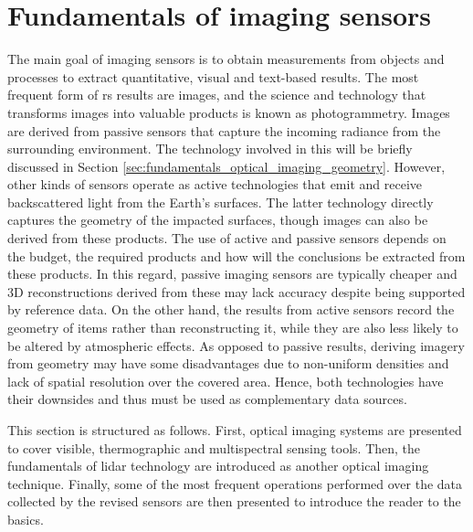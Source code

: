 \setchapterpreamble[u]{\margintoc}
\chapter{Fundamentals of imaging sensors}
\label{sec:fundamentals_rs}


The main goal of imaging sensors is to obtain measurements from objects and processes to extract quantitative, visual and text-based results. The most frequent form of \acrshort{rs} results are images, and the science and technology that transforms images into valuable products is known as photogrammetry. Images are derived from passive sensors that capture the incoming radiance from the surrounding environment. The technology involved in this will be briefly discussed in Section \ref{sec:fundamentals_optical_imaging_geometry}. However, other kinds of sensors operate as active technologies that emit and receive backscattered light from the Earth's surfaces. The latter technology directly captures the geometry of the impacted surfaces, though images can also be derived from these products. The use of active and passive sensors depends on the budget, the required products and how will the conclusions be extracted from these products. In this regard, passive imaging sensors are typically cheaper and 3D reconstructions derived from these may lack accuracy despite being supported by reference data. On the other hand, the results from active sensors record the geometry of items rather than reconstructing it, while they are also less likely to be altered by atmospheric effects. As opposed to passive results, deriving imagery from geometry may have some disadvantages due to non-uniform densities and lack of spatial resolution over the covered area. Hence, both technologies have their downsides and thus must be used as complementary data sources.

This section is structured as follows. First, optical imaging systems are presented to cover visible, thermographic and multispectral sensing tools. Then, the fundamentals of \acrshort{lidar} technology are introduced as another optical imaging technique. Finally, some of the most frequent operations performed over the data collected by the revised sensors are then presented to introduce the reader to the basics. 


